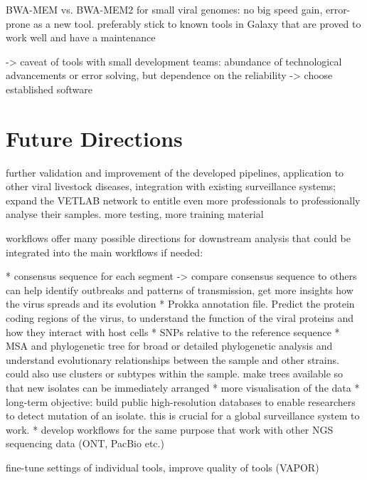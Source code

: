 BWA-MEM vs. BWA-MEM2 for small viral genomes: no big speed gain, error-prone as a new tool. preferably stick to known tools in Galaxy that are proved to work well and have a maintenance

-> caveat of tools with small development teams: abundance of technological advancements or error solving, but dependence on the reliability -> choose established software



\section{Future Directions}
\todoit
further validation and improvement of the developed pipelines, application to other viral livestock diseases, integration with existing surveillance systems; expand the \ac{VETLAB} network to entitle even more professionals to professionally analyse their samples.
more testing, more training material

workflows offer many possible directions for downstream analysis that could be integrated into the main workflows if needed:

* consensus sequence for each segment -> compare consensus sequence to others can help identify outbreaks and patterns of transmission, get more insights how the virus spreads and its evolution
* Prokka annotation file. Predict the protein coding regions of the virus, to understand the function of the viral proteins and how they interact with host cells
* SNPs relative to the reference sequence
* \ac{MSA} and phylogenetic tree for broad or detailed phylogenetic analysis and understand evolutionary relationships between the sample and other strains. could also use clusters or subtypes within the sample. make trees available so that new isolates can be immediately arranged
* more visualisation of the data
* long-term objective: build public high-resolution databases to enable researchers to detect mutation of an isolate. this is crucial for a global surveillance system to work.
* develop workflows for the same purpose that work with other NGS sequencing data (ONT, PacBio etc.)

fine-tune settings of individual tools, improve quality of tools (VAPOR)